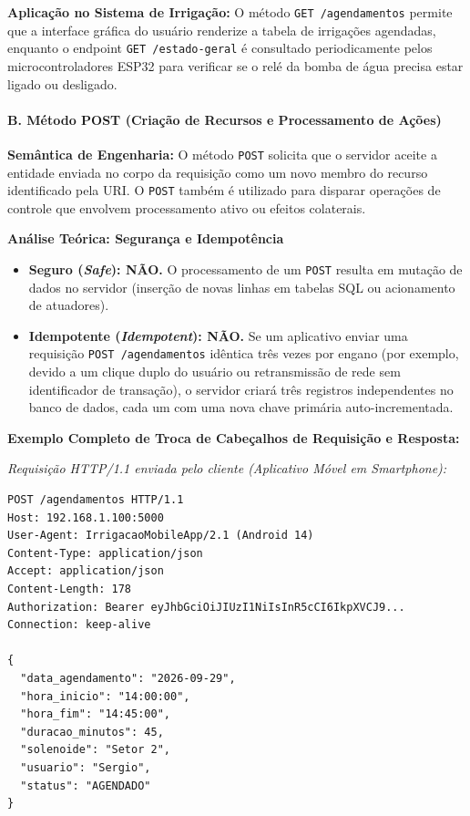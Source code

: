 \textbf{Aplicação no Sistema de Irrigação:} O método \texttt{GET /agendamentos} permite que a interface gráfica do usuário renderize a tabela de irrigações agendadas, enquanto o endpoint \texttt{GET /estado-geral} é consultado periodicamente pelos microcontroladores ESP32 para verificar se o relé da bomba de água precisa estar ligado ou desligado.

\paragraph*{B. Método POST (Criação de Recursos e Processamento de Ações)}

\textbf{Semântica de Engenharia:} O método \texttt{POST} solicita que o servidor aceite a entidade enviada no corpo da requisição como um novo membro do recurso identificado pela URI. O \texttt{POST} também é utilizado para disparar operações de controle que envolvem processamento ativo ou efeitos colaterais.

\textbf{Análise Teórica: Segurança e Idempotência}
\begin{itemize}
    \item \textbf{Seguro (\textit{Safe}): NÃO.} O processamento de um \texttt{POST} resulta em mutação de dados no servidor (inserção de novas linhas em tabelas SQL ou acionamento de atuadores).
    \item \textbf{Idempotente (\textit{Idempotent}): NÃO.} Se um aplicativo enviar uma requisição \texttt{POST /agendamentos} idêntica três vezes por engano (por exemplo, devido a um clique duplo do usuário ou retransmissão de rede sem identificador de transação), o servidor criará três registros independentes no banco de dados, cada um com uma nova chave primária auto-incrementada.
\end{itemize}

\textbf{Exemplo Completo de Troca de Cabeçalhos de Requisição e Resposta:}

\textit{Requisição HTTP/1.1 enviada pelo cliente (Aplicativo Móvel em Smartphone):}
\begin{lstlisting}
POST /agendamentos HTTP/1.1
Host: 192.168.1.100:5000
User-Agent: IrrigacaoMobileApp/2.1 (Android 14)
Content-Type: application/json
Accept: application/json
Content-Length: 178
Authorization: Bearer eyJhbGciOiJIUzI1NiIsInR5cCI6IkpXVCJ9...
Connection: keep-alive

{
  "data_agendamento": "2026-09-29",
  "hora_inicio": "14:00:00",
  "hora_fim": "14:45:00",
  "duracao_minutos": 45,
  "solenoide": "Setor 2",
  "usuario": "Sergio",
  "status": "AGENDADO"
}
\end{lstlisting}

